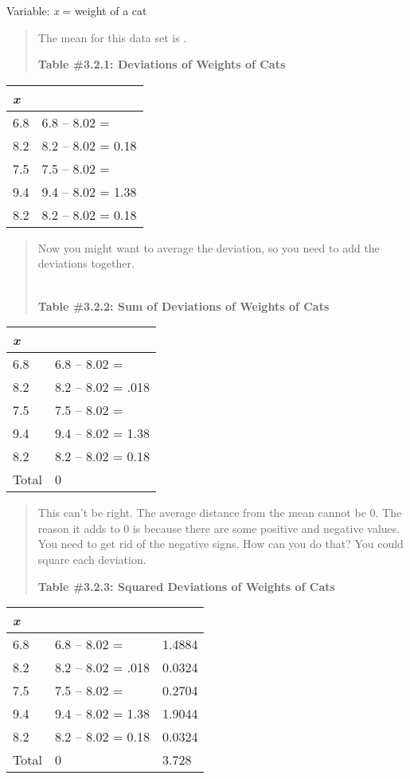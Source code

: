 \documentclass[]{book}
\begin{document}
Variable: \emph{x} = weight of a cat

\begin{quote}
The mean for this data set is .

\textbf{Table \#3.2.1: Deviations of Weights of Cats}
\end{quote}

\begin{longtable}[]{@{}ll@{}}
\toprule
\emph{x} &\tabularnewline
\midrule
\endhead
6.8 & 6.8 -- 8.02 =\tabularnewline
8.2 & 8.2 -- 8.02 = 0.18\tabularnewline
7.5 & 7.5 -- 8.02 =\tabularnewline
9.4 & 9.4 -- 8.02 = 1.38\tabularnewline
8.2 & 8.2 -- 8.02 = 0.18\tabularnewline
\bottomrule
\end{longtable}

\begin{quote}
Now you might want to average the deviation, so you need to add the
deviations together.

\textbf{~\\
Table \#3.2.2: Sum of Deviations of Weights of Cats }
\end{quote}

\begin{longtable}[]{@{}ll@{}}
\toprule
\emph{x} &\tabularnewline
\midrule
\endhead
6.8 & 6.8 -- 8.02 =\tabularnewline
8.2 & 8.2 -- 8.02 = .018\tabularnewline
7.5 & 7.5 -- 8.02 =\tabularnewline
9.4 & 9.4 -- 8.02 = 1.38\tabularnewline
8.2 & 8.2 -- 8.02 = 0.18\tabularnewline
Total & 0\tabularnewline
\bottomrule
\end{longtable}

\begin{quote}
This can't be right. The average distance from the mean cannot be 0.
The reason it adds to 0 is because there are some positive and
negative values. You need to get rid of the negative signs. How can
you do that? You could square each deviation.

\textbf{Table \#3.2.3: Squared Deviations of Weights of Cats}
\end{quote}

\begin{longtable}[]{@{}lll@{}}
\toprule
\emph{x} & &\tabularnewline
\midrule
\endhead
6.8 & 6.8 -- 8.02 = & 1.4884\tabularnewline
8.2 & 8.2 -- 8.02 = .018 & 0.0324\tabularnewline
7.5 & 7.5 -- 8.02 = & 0.2704\tabularnewline
9.4 & 9.4 -- 8.02 = 1.38 & 1.9044\tabularnewline
8.2 & 8.2 -- 8.02 = 0.18 & 0.0324\tabularnewline
Total & 0 & 3.728\tabularnewline
\bottomrule
\end{longtable}
\end{document}
